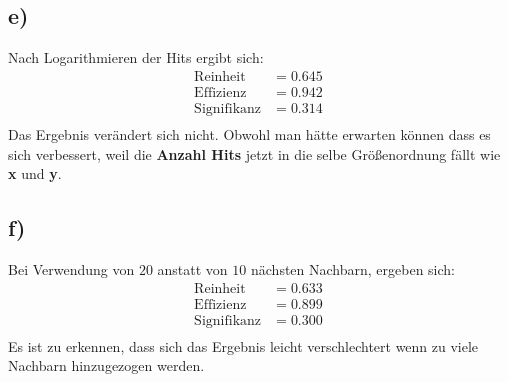 \subsection{e)}
Nach Logarithmieren der Hits ergibt sich:
\\
\begin{align*}
  \text{Reinheit} &= \SI{0.645}{}\\
  \text{Effizienz} &= \SI{0.942}{}\\
  \text{Signifikanz} &= \SI{0.314}{}\\
\end{align*}
Das Ergebnis verändert sich nicht.
Obwohl man hätte erwarten können dass es sich verbessert,
weil die \textbf{Anzahl Hits} jetzt in die selbe
Größenordnung fällt wie \textbf{x} und \textbf{y}.
\subsection{f)}
\label{subsec:a1f}
Bei Verwendung von $20$ anstatt von $10$ nächsten Nachbarn, ergeben sich:
\\
\begin{align*}
  \text{Reinheit} &= \SI{0.633}{}\\
  \text{Effizienz} &= \SI{0.899}{}\\
  \text{Signifikanz} &= \SI{0.300}{}\\
\end{align*}
Es ist zu erkennen, dass sich das Ergebnis leicht verschlechtert wenn zu viele
Nachbarn hinzugezogen werden.
